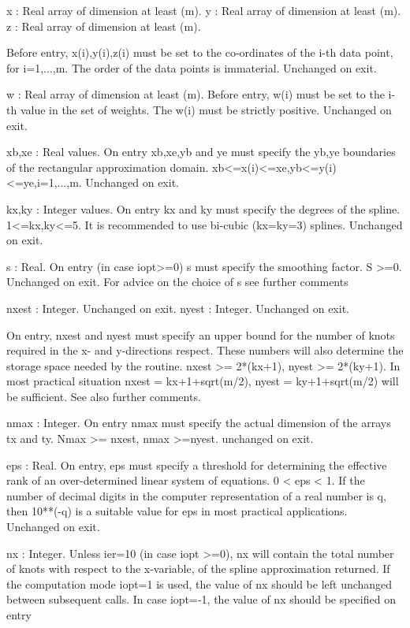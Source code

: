 \documentclass[11pt,twoside,nolof]{starlink}
\begin{document}
\begin{terminalv}
   x     : Real array of dimension at least (m).
   y     : Real array of dimension at least (m).
   z     : Real array of dimension at least (m).

           Before entry, x(i),y(i),z(i) must be set to the co-ordinates
           of the i-th data point, for i=1,...,m. The order of the data
           points is immaterial. Unchanged on exit.

   w     : Real array of dimension at least (m). Before entry, w(i) must
           be set to the i-th value in the set of weights. The w(i) must
           be strictly positive. Unchanged on exit.

   xb,xe : Real values. On entry xb,xe,yb and ye must specify the
   yb,ye   boundaries of the rectangular approximation domain.
           xb<=x(i)<=xe,yb<=y(i)<=ye,i=1,...,m. Unchanged on exit.

   kx,ky : Integer values. On entry kx and ky must specify the degrees
           of the spline. 1<=kx,ky<=5. It is recommended to use bi-cubic
           (kx=ky=3) splines. Unchanged on exit.

   s     : Real. On entry (in case iopt>=0) s must specify the smoothing
           factor. S >=0. Unchanged on exit. For advice on the choice of
           s see further comments

   nxest : Integer. Unchanged on exit.
   nyest : Integer. Unchanged on exit.

           On entry, nxest and nyest must specify an upper bound for the
           number of knots required in the x- and y-directions respect.
           These numbers will also determine the storage space needed by
           the routine. nxest >= 2*(kx+1), nyest >= 2*(ky+1). In most
           practical situation nxest = kx+1+sqrt(m/2),
           nyest = ky+1+sqrt(m/2) will be sufficient. See also further
           comments.

   nmax  : Integer. On entry nmax must specify the actual dimension of
           the arrays tx and ty. Nmax >= nxest, nmax >=nyest.
           unchanged on exit.

   eps   : Real. On entry, eps must specify a threshold for determining the
           effective rank of an over-determined linear system of equations.
           0 < eps < 1.  If the number of decimal digits in the computer
           representation of a real number is q, then 10**(-q) is a
           suitable value for eps in most practical applications. Unchanged
           on exit.

   nx    : Integer. Unless ier=10 (in case iopt >=0), nx will contain the
           total number of knots with respect to the x-variable, of the spline
           approximation returned. If the computation mode iopt=1 is used,
           the value of nx should be left unchanged between subsequent calls.
           In case iopt=-1, the value of nx should be specified on entry


\end{terminalv}
\end{document}
